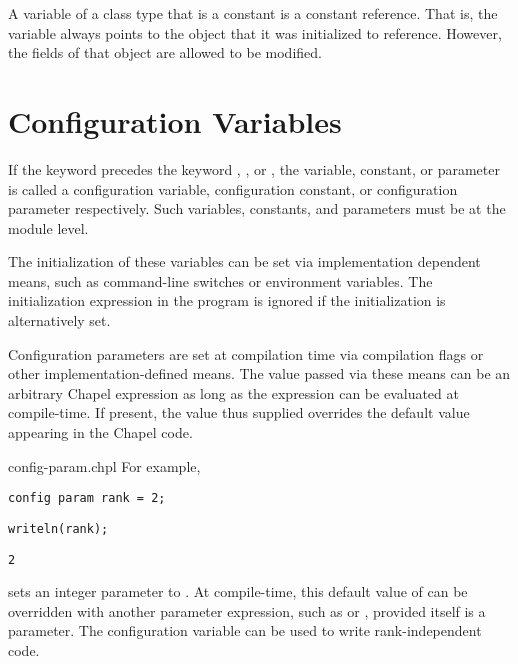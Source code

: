 A variable of a class type that is a constant is a constant reference.
That is, the variable always
points to the object that it was initialized to reference.
However, the fields of that object are allowed to be modified.

\section{Configuration Variables}
\label{Configuration_Variables}

If the keyword  precedes the
keyword , , or , the variable,
constant, or parameter is called a configuration variable,
configuration constant, or configuration parameter respectively.  Such
variables, constants, and parameters must be at the module level.

The initialization of these variables can be set via implementation
dependent means, such as command-line switches or environment
variables.  The initialization expression in the program is ignored if
the initialization is alternatively set.

Configuration parameters are set at compilation time via compilation
flags or other implementation-defined means.  The value passed via
these means can be an arbitrary Chapel expression as long as the
expression can be evaluated at compile-time.  If present, the value thus
supplied overrides the default value appearing in the Chapel code.

\begin{chapelexample}{config-param.chpl}
For example,
\begin{chapel}
\begin{verbatim}
config param rank = 2;
\end{verbatim}
\end{chapel}
\begin{chapelnoprint}
\begin{verbatim}
writeln(rank);
\end{verbatim}
\end{chapelnoprint}
\begin{chapeloutput}
\begin{verbatim}
2
\end{verbatim}
\end{chapeloutput}
sets an integer parameter  to .
At compile-time, this default value of  can be overridden
with another parameter expression, such as  or ,
provided  itself is a parameter. The 
configuration variable can be used to write rank-independent code.
\end{chapelexample}

